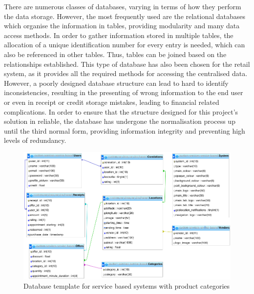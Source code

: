 There are numerous classes of databases, varying in terms of how they perform the data storage. However, the most frequently used are the relational databases which organise the information in tables, providing modularity and many data access methods. In order to gather information stored in multiple tables, the allocation of a unique identification number for every entry is needed, which can also be referenced in other tables. Thus, tables can be joined based on the relationships established. This type of database has also been chosen for the retail system, as it provides all the required methods for accessing the centralised data. However, a poorly designed database structure can lead to hard to identify inconsistencies, resulting in the presenting of wrong information to the end user or even in receipt or credit storage mistakes, leading to financial related complications. In order to ensure that the structure designed for this project's solution in reliable, the database has undergone the normalisation process up until the third normal form, providing information integrity and preventing high levels of redundancy\cite{curcin_2016}.\\

\begin{figure}[!ht]
\centering
\includegraphics[scale=0.4]{img/database_structure.png}
\caption{Database template for service based systems with product categories}
\label{fig:database_structure}
\end{figure}

